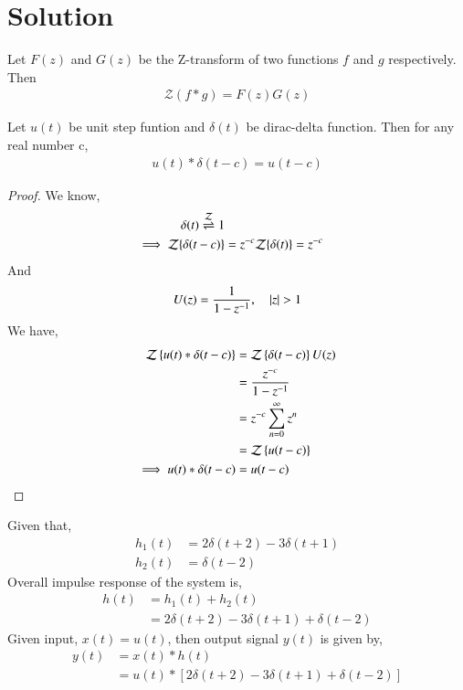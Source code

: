 \documentclass[journal,12pt,twocolumn]{IEEEtran}
\begin{document}
\section{Solution}
\begin{theorem} \label{ct}
Let $F(z)$ and $G(z)$ be the Z-transform of two functions $f$ and $g$ respectively. Then
\begin{align}
\mathcal{Z}(f * g)=F(z)G(z)
\end{align}
\end{theorem}
\begin{lemma}
Let $u(t)$ be unit step funtion and $\delta(t)$ be dirac-delta function. Then for any real number c,
\begin{align}
    u(t)*\delta(t-c) = u(t-c)\label{eqn}
\end{align}
\end{lemma}
\begin{proof}
We know,
\begin{align}
    \delta(t) \overset{\mathcal{Z}}{ \rightleftharpoons} 1\\
    \implies {\mathcal{Z}}\{\delta(t-c)\} &= z^{-c}{\mathcal{Z}}\{\delta(t)\} = z^{-c}
\end{align}
And
\begin{align}
U(z) = \frac{1}{1-z^{-1}}, \quad \vert z\vert > 1
\end{align}
We have,
\begin{align}
\mathcal{Z}\left\{u(t)*\delta(t-c)\right\} &= \mathcal{Z}\left\{\delta(t-c)\right\}U(z)\\ &= \frac{z^{-c}}{1-z^{-1}}\\ &= z^{-c}\sum _{n=0 }^{\infty}z^n\\ &= \mathcal{Z}\left\{u(t-c)\right\}\\
\implies u(t)*\delta(t-c) &= u(t-c) 
\end{align}
\end{proof}
Given that,
\begin{align}
    h_1(t) &= 2\delta(t+2) - 3\delta(t+1)\\
    h_2(t) &= \delta(t-2)
\end{align}
Overall impulse response of the system is,
\begin{align}
    h(t) &= h_1(t) + h_2(t)\\  &= 2\delta(t+2) - 3\delta(t+1) + \delta(t-2)
\end{align}
Given input, $x(t) = u(t)$, then output signal $y(t)$ is given by,
\begin{align}
    y(t) &= x(t)*h(t)\\ 
    &= u(t)*[2\delta(t+2) - 3\delta(t+1) + \delta(t-2)]
\end{align}
\end{document}

